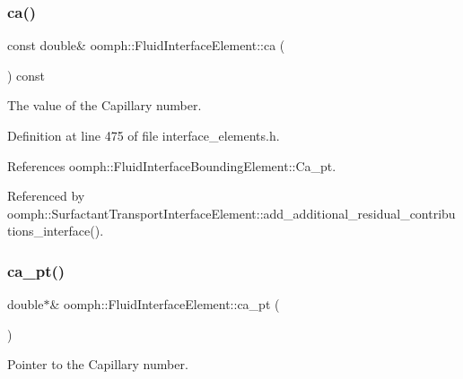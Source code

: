 \mbox{\label{classoomph_1_1FluidInterfaceElement_abcb18ff13b322136dd2346a6b40ecabc}} 
\subsubsection{\texorpdfstring{ca()}{ca()}}
{\footnotesize\ttfamily const double\& oomph\+::\+Fluid\+Interface\+Element\+::ca (\begin{DoxyParamCaption}{ }\end{DoxyParamCaption}) const\hspace{0.3cm}{\ttfamily [inline]}}



The value of the Capillary number. 



Definition at line 475 of file interface\+\_\+elements.\+h.



References oomph\+::\+Fluid\+Interface\+Bounding\+Element\+::\+Ca\+\_\+pt.



Referenced by oomph\+::\+Surfactant\+Transport\+Interface\+Element\+::add\+\_\+additional\+\_\+residual\+\_\+contributions\+\_\+interface().

\mbox{\label{classoomph_1_1FluidInterfaceElement_a1a950f0202d6dd15fab2f0c03927edc9}} 
\subsubsection{\texorpdfstring{ca\+\_\+pt()}{ca\_pt()}}
{\footnotesize\ttfamily double$\ast$\& oomph\+::\+Fluid\+Interface\+Element\+::ca\+\_\+pt (\begin{DoxyParamCaption}{ }\end{DoxyParamCaption})\hspace{0.3cm}{\ttfamily [inline]}}



Pointer to the Capillary number. 



